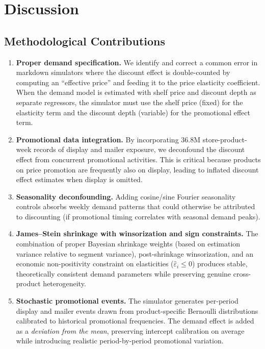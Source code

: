 \documentclass[12pt,a4paper]{article}
\begin{document}
\section{Discussion}
\label{sec:discussion}

\subsection{Methodological Contributions}

\begin{enumerate}[nosep]
\item \textbf{Proper demand specification.} We identify and correct
a common error in markdown simulators where the discount effect is
double-counted by computing an ``effective price'' and feeding it
to the price elasticity coefficient. When the demand model is
estimated with shelf price and discount depth as separate
regressors, the simulator must use the shelf price (fixed) for
the elasticity term and the discount depth (variable) for the
promotional effect term.

\item \textbf{Promotional data integration.} By incorporating 36.8M
store-product-week records of display and mailer exposure,
we deconfound the discount effect from concurrent promotional
activities. This is critical because products on price promotion
are frequently also on display, leading to inflated discount
effect estimates when display is omitted.

\item \textbf{Seasonality deconfounding.} Adding cosine/sine Fourier
seasonality controls absorbs weekly demand patterns that could
otherwise be attributed to discounting (if promotional timing
correlates with seasonal demand peaks).

\item \textbf{James--Stein shrinkage with winsorization and sign
constraints.} The combination of proper Bayesian shrinkage weights
(based on estimation variance relative to segment variance),
post-shrinkage winsorization, and an economic non-positivity
constraint on elasticities ($\hat{\varepsilon}_i \leq 0$) produces
stable, theoretically consistent demand parameters while preserving
genuine cross-product heterogeneity.

\item \textbf{Stochastic promotional events.} The simulator generates
per-period display and mailer events drawn from product-specific
Bernoulli distributions calibrated to historical promotional
frequencies. The demand effect is added as a \emph{deviation from
the mean}, preserving intercept calibration on average while
introducing realistic period-by-period promotional variation.
\end{enumerate}
\end{document}
